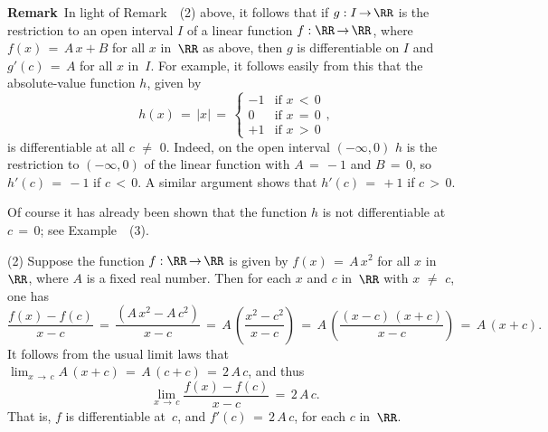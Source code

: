 \V

        {\bf Remark}\, In light of Remark~~(2) above, it follows that if $g:I \,{\rightarrow}\, {\RR}$
    is the restriction to an open interval $I$ of a linear function $f:{\RR} \,{\rightarrow}\, {\RR}$, where $f(x) \,=\, A\,x + B$ for all $x$ in~${\RR}$ as above,
    then $g$ is differentiable on $I$ and $g'(c) \,=\, A$ for all $x$ in~$I$. For example, it follows easily from this that the absolute-value function $h$, given by
        \begin{displaymath}
        h(x) \,=\, |x| \,=\,
        \left\{
        \begin{array}{rl}
        -1 & \mbox{if $x\,<\,0$}   \\
         0 & \mbox{if $x \,=\, 0$} \\
        +1 & \mbox{if $x\,>\,0$}
        \end{array}
        \right.,
        \end{displaymath}
 is differentiable at all $c \,\,{\neq}\,\, 0$. Indeed, on the open interval $(-{\infty},0)$ $h$ is the restriction to $(-{\infty},0)$ of the linear function with $A \,=\, -1$ and $B \,=\, 0$,
    so $h'(c) \,=\, -1$ if $c\,<\,0$. A similar argument shows that $h'(c) \,=\, +1$ if $c\,>\,0$.

        Of course it has already been shown that the function $h$ is not differentiable at $c \,=\, 0$; see Example~~(3).

\V

        (2) Suppose the function $f:{\RR} \,{\rightarrow}\, {\RR}$ is given by $f(x) \,=\, A\,x^{2}$ for all $x$ in~${\RR}$, where $A$ is a fixed real number.
    Then for each $x$ and $c$ in~${\RR}$ with $x \,\,{\neq}\,\, c$, one has
        \begin{displaymath}
        \frac{f(x) - f(c)}{x - c} \,=\, \frac{(A\,x^{2} - A\,c^{2})}{x - c}
     \,=\, A\,\left(\frac{x^{2}-c^{2}}{x-c}\right) \,=\, 
        A\,\left(\frac{(x-c)\,(x+c)}{x-c}\right) \,=\, A\,(x+c).
        \end{displaymath}
    It follows from the usual limit laws that $\lim_{x \,{\rightarrow}\, c} A\,(x+c) \,=\, A\,(c+c) \,=\, 2\,A\,c$, and thus
        \begin{displaymath}
        \lim_{x \,{\rightarrow}\, c} \frac{f(x) - f(c)}{x-c}  \,=\,2\,A\,c.
        \end{displaymath}
    That is, $f$ is differentiable at~$c$, and $f'(c) \,=\, 2\,A\,c$, for each $c$ in~${\RR}$.

